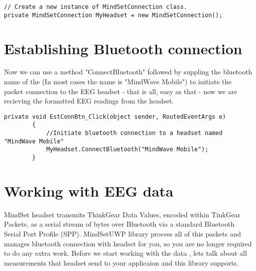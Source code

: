 \documentclass[a4paper,11pt]{book}
\begin{document}
\begin{lstlisting}
// Create a new instance of MindSetConnection class.
private MindSetConnection MyHeadset = new MindSetConnection();
\end{lstlisting}

\section{Establishing Bluetooth connection}
Now we can use a method "ConnectBluetooth" followed by suppling the bluetooth name of the  (In most cases the name is "MindWave Mobile") to initiate the packet connection to the EEG headset - that is all, easy as that - now we are recieving the formatted EEG readings from the headset. 

\begin{lstlisting}
private void EstConnBtn_Click(object sender, RoutedEventArgs e)
        {
            //Initiate bluetooth connection to a headset named "MindWave Mobile"
            MyHeadset.ConnectBluetooth("MindWave Mobile");
        }
\end{lstlisting}

\section{Working with EEG data}
MindSet headset transmits ThinkGear Data Values, encoded within TinkGear Packets, as a serial stream
of bytes over Bluetooth via a standard Bluetooth Serial Port Profile (SPP). MindSetUWP library process all of this packets and manages bluetooth connection with headset for you, so you are no longer required to do any extra work. Before we start working with the data , lets talk about all measurements that headset send to your applicaion and this library supports.
\end{document}
